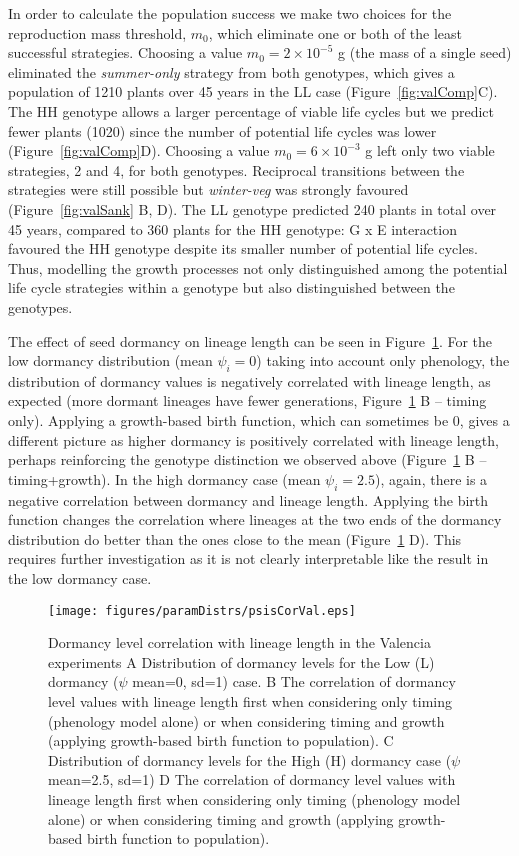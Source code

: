 In order to calculate the population success we make two choices for the
reproduction mass threshold, \(m_{0}\), which eliminate one or both of the least
successful strategies. Choosing a value \(m_{0} = 2 \times 10^{- 5}\) g (the
mass of a single seed) eliminated the \emph{summer-only} strategy from both
genotypes, which gives a population of 1210 plants over 45 years in the LL case
(Figure~\ref{fig:valComp}C). The HH genotype allows a larger percentage of
viable life cycles but we predict fewer plants (1020) since the number of
potential life cycles was lower (Figure~\ref{fig:valComp}D). Choosing a value
\(m_{0} = 6 \times 10^{- 3}\) g left only two viable strategies, 2 and 4, for
both genotypes. Reciprocal transitions between the strategies were still
possible but \emph{winter-veg} was strongly favoured (Figure~\ref{fig:valSank}
B, D). The LL genotype predicted 240 plants in total over 45 years, compared to
360 plants for the HH genotype: G x E interaction favoured the HH genotype
despite its smaller number of potential life cycles. Thus, modelling the growth
processes not only distinguished among the potential life cycle strategies
within a genotype but also distinguished between the genotypes.

The effect of seed dormancy on lineage length can be seen in
Figure~\ref{fig:psisCorVal}. For the low dormancy distribution (mean $\psi_i=0$)
taking into account only phenology, the distribution of dormancy values is
negatively correlated with lineage length, as expected (more dormant lineages
have fewer generations, Figure~\ref{fig:psisCorVal} B -- timing only). Applying
a growth-based birth function, which can sometimes be $0$, gives a different
picture as higher dormancy is positively correlated with lineage length, perhaps
reinforcing the genotype distinction we observed above
(Figure~\ref{fig:psisCorVal} B -- timing+growth). In the high dormancy case
(mean $\psi_i =2.5$), again, there is a negative correlation between dormancy
and lineage length. Applying the birth function changes the correlation where
lineages at the two ends of the dormancy distribution do better than the ones
close to the mean (Figure~\ref{fig:psisCorVal} D). This requires further
investigation as it is not clearly interpretable like the result in the low
dormancy case.

\begin{figure}[tb]
  \centering
  \texttt{[image: figures/paramDistrs/psisCorVal.eps]}
  \caption{Dormancy level correlation with lineage length in the Valencia
    experiments A Distribution of dormancy levels for the Low (L) dormancy
    ($\psi$ mean=0, sd=1) case. B The correlation of dormancy level values with
    lineage length first when considering only timing (phenology model alone) or
    when considering timing and growth (applying growth-based birth function to
    population). C Distribution of dormancy levels for the High (H) dormancy
    case ($\psi$ mean=2.5, sd=1) D The correlation of dormancy level values with
    lineage length first when considering only timing (phenology model alone) or
    when considering timing and growth (applying growth-based birth function to
    population).}
  \label{fig:psisCorVal}
\end{figure}




